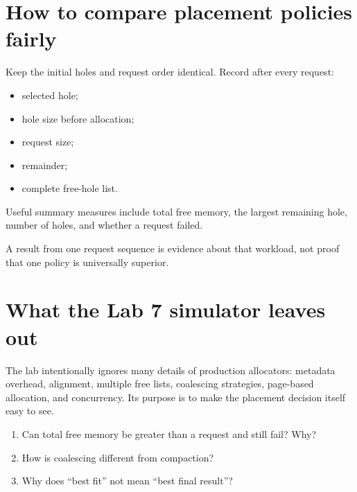 \section{How to compare placement policies fairly}
Keep the initial holes and request order identical. Record after every request:
\begin{itemize}
  \item selected hole;
  \item hole size before allocation;
  \item request size;
  \item remainder;
  \item complete free-hole list.
\end{itemize}
Useful summary measures include total free memory, the largest remaining hole, number of holes, and whether a request failed.

\begin{pitfall}
A result from one request sequence is evidence about that workload, not proof that one policy is universally superior.
\end{pitfall}

\section{What the Lab 7 simulator leaves out}
The lab intentionally ignores many details of production allocators: metadata overhead, alignment, multiple free lists, coalescing strategies, page-based allocation, and concurrency. Its purpose is to make the placement decision itself easy to see.

\begin{quickcheck}
\begin{enumerate}
  \item Can total free memory be greater than a request and still fail? Why?
  \item How is coalescing different from compaction?
  \item Why does ``best fit'' not mean ``best final result''?
\end{enumerate}
\end{quickcheck}


